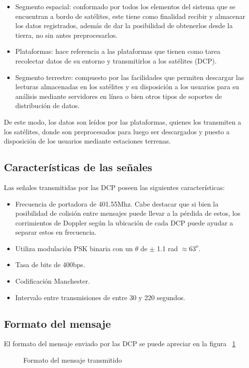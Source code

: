 \documentclass[a4paper,10pt]{article}
\begin{document}
\begin{itemize}
\item Segmento espacial: conformado por todos los elementos del sistema que se encuentran a bordo de satélites, este tiene como finalidad
recibir y almacenar los datos registrados, además de dar la posibilidad de obtenerlos desde la tierra, no sin antes preprocesarlos.
\item Plataformas: hace referencia a las plataformas que tienen como tarea recolectar datos de su entorno y transmitirlos a los satélites (DCP).
\item Segmento terrestre: compuesto por las facilidades que permiten descargar las lecturas almacenadas en los satélites y su disposición
a los usuarios para su análisis mediante servidores en línea o bien otros tipos de soportes de distribución de datos.
\end{itemize}
De este modo, los datos son leídos por las plataformas, quienes los transmiten a los satélites, donde son preprocesados para luego ser descargados 
y puesto a disposición de los usuarios mediante estaciones terrenas.


\subsection{Características de las señales}
Las señales transmitidas por las DCP poseen las siguientes características:
\begin{itemize}
\item Frecuencia de portadora de 401.55Mhz. Cabe destacar que si bien la posibilidad de colisión entre mensajes puede llevar a la pérdida de estos, 
los corrimientos de Doppler según la ubicación de cada DCP puede ayudar a separar estos en frecuencia.
\item Utiliza modulación PSK binaria con un $\theta$ de $\pm $ 1.1 rad $ \approx 63^o$.
\item Tasa de bits de 400bps.
\item Codificación Manchester.
\item Intervalo entre transmisiones de entre 30 y 220 segundos.
\end{itemize}

\subsection{Formato del mensaje}
El formato del mensaje enviado por las DCP se puede apreciar en la figura ~\ref{formatoMensaje}

\begin{figure}[H]
\centering
{}
\caption{Formato del mensaje transmitido}
\label{formatoMensaje}
\end{figure}
\end{document}
